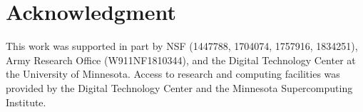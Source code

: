 \documentclass[conference]{IEEEtran}
\begin{document}



\section*{Acknowledgment}

This work was supported in part by NSF (1447788, 1704074, 1757916, 1834251), Army Research Office (W911NF1810344), and the Digital Technology Center at the University of Minnesota. Access to research and computing facilities was provided by the Digital Technology Center and the Minnesota Supercomputing Institute.








\end{document}
